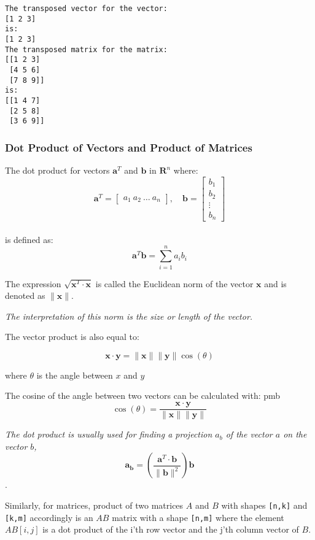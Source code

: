 \documentclass[11pt]{article}
\begin{document}
    \begin{Verbatim}[commandchars=\\\{\}]
The transposed vector for the vector:
[1 2 3]
is:
[1 2 3]
The transposed matrix for the matrix:
[[1 2 3]
 [4 5 6]
 [7 8 9]]
is:
[[1 4 7]
 [2 5 8]
 [3 6 9]]
    \end{Verbatim}

    \newpage

\subsubsection{Dot Product of Vectors and Product of
Matrices}\label{dot-product-of-vectors-and-product-of-matrices}

The dot product for vectors \(\pmb{a}^T\) and \(\pmb{b}\) in
\(\pmb{R}^n\) where: \[
\pmb{a}^T = \begin{bmatrix}
a_1 \
a_2 \
\dots\
a_n
\end{bmatrix}, \quad
\pmb{b} = \begin{bmatrix}
b_1 \\
b_2 \\
\vdots \\
b_n
\end{bmatrix}
\]\\
is defined as: \[
\pmb{a}^T \pmb{b} = \sum_{i=1}^{n} a_i b_i
\]

The expression \(\sqrt{\pmb{x}^{T}\cdot\pmb{x}}\) is called the
Euclidean norm of the vector \(\pmb{x}\) and is denoted as
\(\|\pmb{x}\|\).

\emph{The interpretation of this norm is the size or length of the
vector.}

The vector product is also equal to:

\[\pmb{x} \cdot \pmb{y} = \|\pmb{x}\| \|\pmb{y}\| \cos(\theta)\]

where \(\theta\) is the angle between \(x\) and \(y\)

The cosine of the angle between two vectors can be calculated with: pmb
\[\cos(\theta) = \frac{\pmb{x} \cdot \pmb{y}}{\|\pmb{x}\| \|\pmb{y}\|}\]

\emph{The dot product is usually used for finding a projection \(a_b\)
of the vector \(a\) on the vector \(b\), \[
{\pmb{a_b}} = \left( \frac{\pmb{a}^T \cdot \pmb{b}}{\|\pmb{b}\|^2} \right) \pmb{b}
\]}.

Similarly, for matrices, product of two matrices \(A\) and \(B\) with
shapes \texttt{{[}n,k{]}} and \texttt{{[}k,m{]}} accordingly is an
\({AB}\) matrix with a shape \texttt{{[}n,m{]}} where the element
\({AB[i,j]}\) is a dot product of the i'th row vector and the j'th
column vector of \({B}\).
\end{document}
